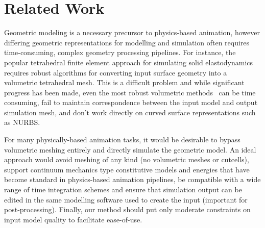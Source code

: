 \section{Related Work}

Geometric modeling is a necessary precursor to physics-based animation, however differing geometric representations for modelling and simulation often requires
time-consuming, complex geometry processing pipelines. 
For instance, the popular tetrahedral finite element approach for simulating solid elastodynamics~\cite{10.1145/2343483.2343501} requires robust algorithms for converting input surface geometry into 
a volumetric tetrahedral mesh. This is a difficult problem and while significant progress has been made,
even the most robust volumetric methods~\cite{Hu:2018:TMW:3197517.3201353} can be time consuming, fail to maintain correspondence between the input model and output simulation mesh,
and don't work directly on curved surface representations such as NURBS.  


For many physically-based animation tasks, it would be desirable to bypass volumetric meshing entirely and directly simulate the geometric model.
An ideal approach would avoid meshing of any kind (no volumetric meshes or cutcells), support continuum mechanics type constitutive models 
and energies that have become standard in physics-based animation pipelines, be compatible with a wide range of time integration schemes and
ensure that simulation output can be edited in the same modelling software used to create the input (important for post-processing). 
Finally, our method should put only moderate constraints on input model quality to facilitate ease-of-use.

